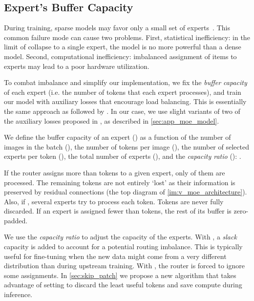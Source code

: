 \documentclass{article}
\begin{document}
\subsection{Expert's Buffer Capacity}
\label{sec:expert_capacity}
During training, sparse models may favor only a small set of experts~\cite{hansen1999combining,rosenbaum2019routing}.
This common failure mode can cause two problems.
First, statistical inefficiency: in the limit of collapse to a single expert, the model is no more powerful than a dense model.
Second, computational inefficiency: imbalanced assignment of items to experts may lead to a poor hardware utilization.

To combat imbalance and simplify our implementation, we fix the \emph{buffer capacity} of each expert 
(i.e. the number of tokens that each expert processes), 
and train our model with auxiliary losses that encourage load balancing. This is essentially the same approach as followed by
\cite{shazeer2017outrageously,lepikhin2020gshard,fedus2021switch}. In our case, we use slight variants of two of the auxiliary 
losses proposed in \cite{shazeer2017outrageously}, as described in \cref{sec:app_moe_model}. 

We define the buffer capacity of an expert () as a function of the number of images in the batch (), the number of tokens 
per image (),  the number of selected experts per token (), the total number of experts (), and the \emph{capacity ratio} ():
.

If the router assigns more than  tokens to a given expert, only  of them are processed.
The remaining tokens are not entirely `lost' as their information is preserved by residual connections (the 
top diagram of \cref{im:v_moe_architecture}).
Also, if , several experts try to process each token.
Tokens are never fully discarded.
If an expert is assigned fewer than  tokens, the rest of its buffer is zero-padded. 

We use the \emph{capacity ratio} to adjust the capacity of the experts. With , a \emph{slack} capacity is added to account for a potential 
routing imbalance. This is typically useful for fine-tuning when the new data might come from a very different distribution than during upstream training. 
With , the router is forced to ignore some assignments. In \cref{sec:skip_patch} we propose a new algorithm that takes 
advantage of setting  to discard the least useful tokens and save compute during inference.
\end{document}
